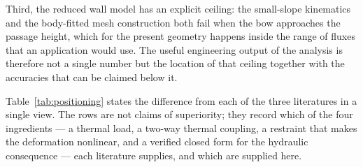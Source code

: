 \documentclass[11pt,a4paper]{article}
\begin{document}
Third, the reduced wall model has an explicit ceiling: the small-slope
kinematics and the body-fitted mesh construction both fail when the bow
approaches the passage height, which for the present geometry happens inside
the range of fluxes that an application would use. The useful engineering
output of the analysis is therefore not a single number but the location of
that ceiling together with the accuracies that can be claimed below it.

Table~\ref{tab:positioning} states the difference from each of the three literatures in a
single view. The rows are not claims of superiority; they record which of the four ingredients
--- a thermal load, a two-way thermal coupling, a restraint that makes the deformation
nonlinear, and a verified closed form for the hydraulic consequence --- each literature
supplies, and which are supplied here.
\end{document}
